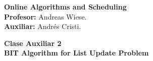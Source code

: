 \documentclass[11pt, spanish]{article}
\theoremstyle{plain}
\begin{document}

\begin{flushleft}
  \textbf{Online Algorithms and Scheduling}
  \\\textbf{Profesor:} Andreas Wiese.
  \\\textbf{Auxiliar:} Andrés Cristi.
\end{flushleft}


\begin{center}
  \large{\textbf{Clase Auxiliar 2\\ BIT Algorithm for List Update Problem}}
\end{center}

\end{document}
